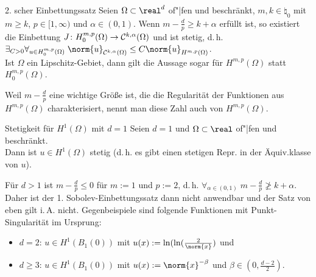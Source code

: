 \begin{Satz}{2. scher Einbettungssatz}
    Seien $\Omega \subset \real^d$ of"|fen und beschränkt,
    $m, k \in \natural_0$ mit $m \ge k$,
    $p \in [1, \infty)$ und
    $\alpha \in (0, 1)$.
    Wenn $m - \frac{d}{p} \ge k + \alpha$ erfüllt ist,
    so existiert die Einbettung $J\colon H_0^{m,p}(\Omega) \to \mathcal{C}^{k,\alpha}(\Omega)$
    und ist stetig,
    d.\,h. $\exists_{C > 0} \forall_{u \in H_0^{m,p}(\Omega)}\;
    \norm{u}_{\C^{k,\alpha}(\Omega)} \le C \norm{u}_{H^{m,p}(\Omega)}$.\\
    Ist $\Omega$ ein Lipschitz-Gebiet, dann gilt die Aussage sogar für
    $H^{m,p}(\Omega)$ statt $H_0^{m,p}(\Omega)$.
\end{Satz}

\begin{Bem}
    Weil $m - \frac{d}{p}$ eine wichtige Größe ist, die die Regularität der
    Funktionen aus $H^{m,p}(\Omega)$ charakterisiert,
    nennt man diese Zahl auch  von $H^{m,p}(\Omega)$.
\end{Bem}

\linie

\begin{Satz}{Stetigkeit für $H^1(\Omega)$ mit $d = 1$}
    Seien $d = 1$ und $\Omega \subset \real$ of"|fen und beschränkt.\\
    Dann ist $u \in H^1(\Omega)$ stetig
    (d.\,h. es gibt einen stetigen Repr. in der Äquiv.klasse von $u$).
\end{Satz}

\begin{Bem}
    Für $d > 1$ ist $m - \frac{d}{p} \le 0$ für $m := 1$ und $p := 2$,
    d.\,h. $\forall_{\alpha \in (0, 1)}\; m - \frac{d}{p} \not\ge k + \alpha$.\\
    Daher ist der 1. Sobolev-Einbettungssatz dann nicht anwendbar und der Satz von eben
    gilt i.\,A. nicht.
    Gegenbeispiele sind folgende Funktionen mit Punkt-Singularität im Ursprung:
    \begin{itemize}
        \item
        $d = 2$:
        $u \in H^1(B_1(0))$ mit
        $u(x) := \ln(\ln(\frac{2}{\norm{x}})$ und
        
        \item
        $d \ge 3$:
        $u \in H^1(B_1(0))$ mit
        $u(x) := \norm{x}^{-\beta}$ und $\beta \in (0, \frac{d-2}{2})$.
    \end{itemize}
\end{Bem}

